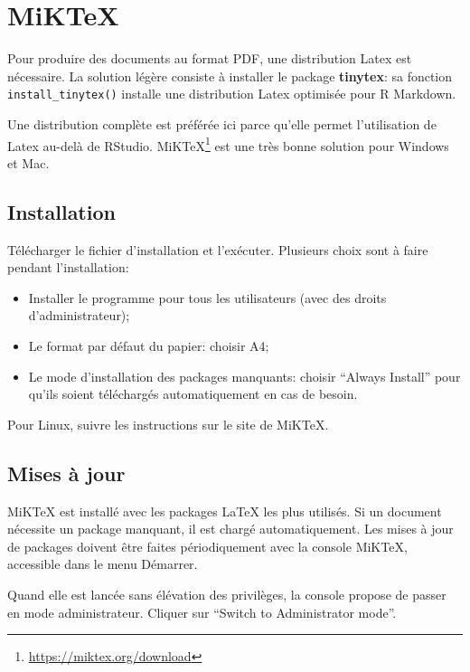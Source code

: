 \documentclass[
  11pt,
  french,
  a4paper,
  extrafontsizes,onecolumn,openright
  ]{memoir}
\providecommand{\tightlist}{%
  \setlength{\itemsep}{0pt}\setlength{\parskip}{0pt}}
\begin{document}
\hypertarget{miktex}{%
\section{MiKTeX}\label{miktex}}

Pour produire des documents au format PDF, une distribution Latex est nécessaire.
La solution légère consiste à installer le package \textbf{tinytex}: sa fonction \texttt{install\_tinytex()} installe une distribution Latex optimisée pour R Markdown.

Une distribution complète est préférée ici parce qu'elle permet l'utilisation de Latex au-delà de RStudio.
MiKTeX\footnote{\url{https://miktex.org/download}} est une très bonne solution pour Windows et Mac.

\hypertarget{installation-2}{%
\subsection{Installation}\label{installation-2}}

Télécharger le fichier d'installation et l'exécuter.
Plusieurs choix sont à faire pendant l'installation:

\begin{itemize}
\tightlist
\item
  Installer le programme pour tous les utilisateurs (avec des droits d'administrateur);
\item
  Le format par défaut du papier: choisir A4;
\item
  Le mode d'installation des packages manquants: choisir ``Always Install'' pour qu'ils soient téléchargés automatiquement en cas de besoin.
\end{itemize}

Pour Linux, suivre les instructions sur le site de MiKTeX.

\hypertarget{mises-uxe0-jour}{%
\subsection{Mises à jour}\label{mises-uxe0-jour}}

MiKTeX est installé avec les packages LaTeX les plus utilisés.
Si un document nécessite un package manquant, il est chargé automatiquement.
Les mises à jour de packages doivent être faites périodiquement avec la console MiKTeX, accessible dans le menu Démarrer.

Quand elle est lancée sans élévation des privilèges, la console propose de passer en mode administrateur.
Cliquer sur ``Switch to Administrator mode''.
\end{document}
